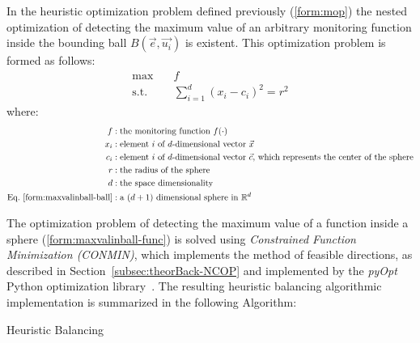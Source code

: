 In the heuristic optimization problem defined previously (\ref{form:mop}) the nested optimization of detecting the maximum value of an arbitrary monitoring function inside the bounding ball $B(\vec{e},\vec{u_i})$ is existent. This optimization problem is formed as follows:
\begin{align}
\max &\quad f \label{form:maxvalinball-func}\\
	\text{s.t.}&\quad \sum_{i=1}^d(x_i-c_i)^2=r^2 \label{form:maxvalinball-ball}
\end{align}
where:
\begin{align*}
f&: \text{the monitoring function $f(\cdot)$}\\
x_i&: \text{element $i$ of $d$-dimensional vector $\vec{x}$}\\
c_i&: \text{element $i$ of $d$-dimensional vector $\vec{c}$, which represents the center of the sphere}\\
r&: \text{the radius of the sphere}\\
d&: \text{the space dimensionality}\\
\text{Eq.~\ref{form:maxvalinball-ball}}&:\text{a $(d+1)$ dimensional sphere in $\mathbb{R}^d$}
\end{align*}

The optimization problem of detecting the maximum value of a function inside a sphere (\ref{form:maxvalinball-func}) is solved using \emph{Constrained Function Minimization (CONMIN)}, which implements the method of feasible directions, as described in Section~\ref{subsec:theorBack-NCOP} and implemented by the \emph{pyOpt} Python optimization library~\cite{pyOptCONMIN}.
\newpage
The resulting heuristic balancing algorithmic implementation is summarized in the following Algorithm:\\
\begin{algorithm}[H]
\SetAlgoLined
{}


\caption{Heuristic Balancing \label{algo:heuristicbalancing}} 
\end{algorithm}

